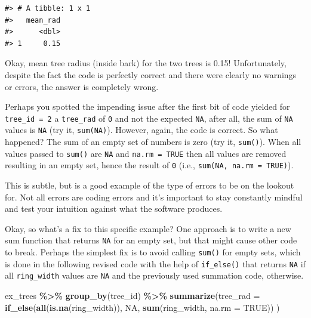 \documentclass[
  11pt,
]{krantz}
\newenvironment{Shaded}{\begin{snugshade}}{\end{snugshade}}
\newcommand{\DataTypeTok}[1]{\textcolor[rgb]{0.13,0.29,0.53}{#1}}
\newcommand{\KeywordTok}[1]{\textcolor[rgb]{0.13,0.29,0.53}{\textbf{#1}}}
\newcommand{\NormalTok}[1]{#1}
\newcommand{\OperatorTok}[1]{\textcolor[rgb]{0.81,0.36,0.00}{\textbf{#1}}}
\newcommand{\OtherTok}[1]{\textcolor[rgb]{0.56,0.35,0.01}{#1}}
\newcommand{\StringTok}[1]{\textcolor[rgb]{0.31,0.60,0.02}{#1}}
\theoremstyle{definition}
\theoremstyle{definition}
\theoremstyle{definition}
\theoremstyle{definition}
\theoremstyle{remark}
\begin{document}
\begin{verbatim}
#> # A tibble: 1 x 1
#>   mean_rad
#>      <dbl>
#> 1     0.15
\end{verbatim}

Okay, mean tree radius (inside bark) for the two trees is 0.15! Unfortunately, despite the fact the code is perfectly correct and there were clearly no warnings or errors, the answer is completely wrong.

Perhaps you spotted the impending issue after the first bit of code yielded for \texttt{tree\_id\ =\ 2} a \texttt{tree\_rad} of \texttt{0} and not the expected \texttt{NA}, after all, the sum of \texttt{NA} values is \texttt{NA} (try it, \texttt{sum(NA)}). However, again, the code is correct. So what happened? The sum of an empty set of numbers is zero (try it, \texttt{sum()}). When all values passed to \texttt{sum()} are \texttt{NA} and \texttt{na.rm\ =\ TRUE} then all values are removed resulting in an empty set, hence the result of \texttt{0} (i.e., \texttt{sum(NA,\ na.rm\ =\ TRUE)}).

This is subtle, but is a good example of the type of errors to be on the lookout for. Not all errors are coding errors and it's important to stay constantly mindful and test your intuition against what the software produces.

Okay, so what's a fix to this specific example? One approach is to write a new sum function that returns \texttt{NA} for an empty set, but that might cause other code to break. Perhaps the simplest fix is to avoid calling \texttt{sum()} for empty sets, which is done in the following revised code with the help of \texttt{if\_else()} that returns \texttt{NA} if all \texttt{ring\_width} values are \texttt{NA} and the previously used summation code, otherwise.

\begin{Shaded}
\begin{Highlighting}[]
\NormalTok{ex\_trees }\OperatorTok{\%\textgreater{}\%}\StringTok{ }\KeywordTok{group\_by}\NormalTok{(tree\_id) }\OperatorTok{\%\textgreater{}\%}\StringTok{ }
\StringTok{  }\KeywordTok{summarize}\NormalTok{(}\DataTypeTok{tree\_rad =} 
              \KeywordTok{if\_else}\NormalTok{(}\KeywordTok{all}\NormalTok{(}\KeywordTok{is.na}\NormalTok{(ring\_width)), }\OtherTok{NA}\NormalTok{, }\KeywordTok{sum}\NormalTok{(ring\_width, }\DataTypeTok{na.rm =} \OtherTok{TRUE}\NormalTok{))}
\NormalTok{)}
\end{Highlighting}
\end{Shaded}
\end{document}
